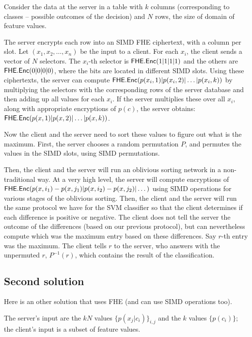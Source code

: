 \documentclass[11pt]{article}
\begin{document}
Consider the data at the server in a table with $k$ columns (corresponding to classes -- possible outcomes of the decision) and $N$ rows, the size of domain of feature values. 

The server encrypts each row into an SIMD FHE ciphertext, with a column per slot. 
Let $(x_1, x_2, \dots, x_n)$ be the input to a client.
For each $x_i$, the client sends a vector of $N$ selectors. The $x_i$-th selector is $\mathsf{FHE.Enc}(1|1|1|1)$ and the others are $\mathsf{FHE.Enc}(0|0|0|0)$, where the bits are located in different SIMD slots. Using these ciphertexts, the server can compute $\mathsf{FHE.Enc}(p(x_i, 1)|p(x_i, 2)| \dots | p(x_i, k))$ by multiplying the selectors with the corresponding rows of the server database and then adding up all values for each $x_i$.  If the server multiplies these over all $x_i$, along with appropriate encryptions of $p(c)$, the server obtains:
 $\mathsf{FHE.Enc}(p(x,1)|p(x, 2)| \dots | p(x, k))$.
 
 Now the client and the server need to sort these values to figure out what is the maximum.
 First, the server chooses a random permutation $P$, and permutes the values in the SIMD slots, using SIMD permutations.
 
 Then, the client and the server will run an oblivious sorting network in a non-traditional way. At a very high level, the server will compute encryptions of $\mathsf{FHE.Enc}(p(x, i_1) - p(x, j_1) | p(x, i_2) - p(x, j_2) | \dots )$ using SIMD operations for various stages of the oblivious sorting. Then, the client and the server will run the same protocol we have for the SVM classifier so that the client determines if each difference is positive or negative.  The client does not tell the server the outcome of the differences (based on our previous protocol), but can nevertheless compute which was the maximum entry based on these differences. Say $r$-th entry was the maximum. The client tells $r$ to the server, who answers with the unpermuted $r$, $P^{-1}(r)$, which contains the result of the classification.
   

\subsection{Second solution} %
\label{sub:bayes_solution_2}
	Here is an other solution that uses FHE (and can use SIMD operations too).
	
	The server's input are the $kN$ values $\{p(x_j|c_i)\}_{i,j}$ and the $k$ values $\{p(c_i)\}$; the client's input is a subset of feature values.
	
\end{document}

